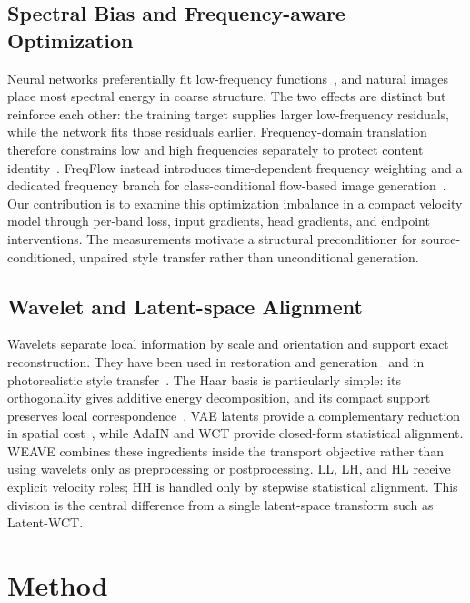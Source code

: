 \documentclass[letterpaper]{article}
\begin{document}
\subsection{Spectral Bias and Frequency-aware Optimization}
\label{sec:rw-spectral}
Neural networks preferentially fit low-frequency functions~\cite{rahaman2019spectral,xu2022frequency},
and natural images place most spectral energy in coarse structure. The two effects are
distinct but reinforce each other: the training target supplies larger low-frequency
residuals, while the network fits those residuals earlier. Frequency-domain translation
therefore constrains low and high frequencies separately to protect content identity~\cite{cai2021fdit}.
FreqFlow instead introduces time-dependent frequency weighting and a dedicated frequency
branch for class-conditional flow-based image generation~\cite{ren2026freqflow}.
Our contribution is to examine this optimization imbalance in a compact velocity model through
per-band loss, input gradients, head
gradients, and endpoint interventions. The measurements motivate a structural preconditioner
for source-conditioned, unpaired style transfer rather than unconditional generation.

\subsection{Wavelet and Latent-space Alignment}
\label{sec:rw-wavelet}
Wavelets separate local information by scale and orientation and support exact
reconstruction. They have been used in restoration and generation~\cite{phung2023wavelet}
and in photorealistic style transfer~\cite{yoo2019photorealistic}. The Haar basis is
particularly simple: its orthogonality gives additive energy decomposition, and its compact
support preserves local correspondence~\cite{daubechies1992ten}. VAE latents provide a
complementary reduction in spatial cost~\cite{rombach2022high}, while AdaIN and WCT provide
closed-form statistical alignment.
WEAVE combines these ingredients inside the transport objective rather than using wavelets
only as preprocessing or postprocessing. LL, LH, and HL receive explicit velocity roles;
HH is handled only by stepwise statistical alignment. This division is the central difference from a
single latent-space transform such as Latent-WCT.



\section{Method}
\label{sec:method}
\end{document}
